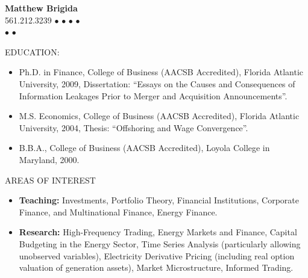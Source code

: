 \documentclass[9pt]{article}
\begin{document}
\fontsize{9}{11}\selectfont
\begin{center}
{\bf  {\Large Matthew Brigida}}\\
\hspace*{22pt}561.212.3239 $\bullet$ \href{mailto: matthew.brigida@sunyit.edu}{} $\bullet$ %
\href{https://github.com/Matt-Brigida}{\color{Blue}{GitHub}} $\bullet$
\href{http://www.complete-markets.com}{\color{Blue}{Complete Markets}} $\bullet$ \href{https://www.youtube.com/channel/UCwekb0vAK-FKaqPF5gfd0eQ?view_as=subscriber}{\color{Blue}{YouTube}}\\
\hspace*{22pt} \href{https://github.com/Matt-Brigida/job_market_materials/raw/master/teaching_phil/teaching_phil.pdf}{\color{Blue}{Statement of Teaching Philosophy}} $\bullet$ \href{https://github.com/Matt-Brigida/job_market_materials/raw/master/Evidence_teaching_effectiveness/Brigida_evidence_teaching_effectiveness.pdf}{\color{Blue}{Evidence of Teaching Effectiveness}} $\bullet$ \href{https://github.com/Matt-Brigida/job_market_materials/raw/master/research_phil/research_phil.pdf}{\color{Blue}{Statement of Research Philosophy}}
\end{center}
EDUCATION:
\begin{itemize}[noitemsep, nolistsep]
\item Ph.D. in Finance, College of Business (AACSB Accredited), Florida Atlantic University, 2009, Dissertation:
``Essays on the Causes and Consequences of Information Leakages Prior to Merger and Acquisition
Announcements''.
\item M.S. Economics, College of Business (AACSB Accredited), Florida Atlantic University, 2004, Thesis: ``Offshoring
and Wage Convergence''.
\item B.B.A., College of Business (AACSB Accredited), Loyola College in Maryland, 2000.
\end{itemize}
\vspace{10pt}
AREAS OF INTEREST
\begin{itemize}[noitemsep, nolistsep]
\item {\bf Teaching:} Investments, Portfolio Theory, Financial Institutions, Corporate Finance, and Multinational Finance, Energy Finance.
\item {\bf Research:} High-Frequency Trading, Energy Markets and Finance, Capital Budgeting in the Energy Sector, Time Series Analysis (particularly allowing unobserved variables), Electricity Derivative Pricing (including real option valuation of generation assets), Market Microstructure, Informed Trading.
\end{itemize}
\end{document}
